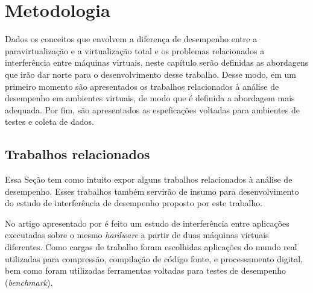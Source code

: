 \chapter{Metodologia}
\label{cap:metodologia}
Dados os conceitos que envolvem a diferença de desempenho entre a paravirtualização e a virtualização total e os problemas relacionados a interferência entre máquinas virtuais, neste capítulo serão definidas as abordagens que irão dar norte para o desenvolvimento desse trabalho. Desse modo, em um primeiro momento são apresentados os trabalhos relacionados à análise de desempenho em ambientes virtuais, de modo que é definida a abordagem mais adequada. Por fim, são apresentados as espeficações voltadas para ambientes de testes e coleta de dados.
\section{Trabalhos relacionados}
Essa Seção tem como intuito expor alguns trabalhos relacionados à análise de desempenho. Esses trabalhos também servirão de insumo para desenvolvimento do estudo de interferência de desempenho proposto por este trabalho.

No artigo apresentado por  é feito um estudo de interferência entre aplicações executadas sobre o mesmo \textit{hardware} a partir de duas máquinas virtuais diferentes. Como cargas de trabalho foram escolhidas aplicações do mundo real utilizadas para compressão, compilação de código fonte, e processamento digital, bem como foram utilizadas ferramentas voltadas para testes de desempenho (\textit{benchmark}).



